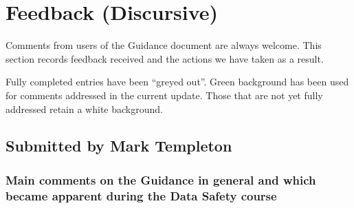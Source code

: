 %
\section{Feedback (Discursive)} \label{bkm:feedback}


Comments from users of the Guidance document are always welcome.
This section records feedback received and the actions we have taken as a result.

Fully completed entries have been ``greyed out''. Green background has been used for comments addressed in the current update.
Those that are not yet fully addressed retain a white background.
\subsection{Submitted by Mark Templeton}
\subsubsection{Main comments on the Guidance in general and which became apparent during the Data Safety course}


